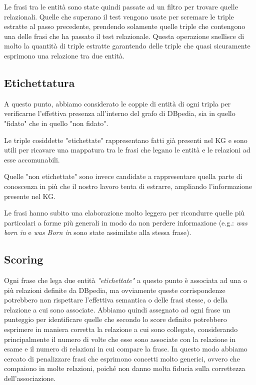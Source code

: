\documentclass[10pt,a4paper,twocolumn]{article}
\begin{document}
Le frasi tra le entità sono state quindi passate ad un filtro per trovare quelle relazionali. Quelle che superano il test vengono usate per scremare le triple estratte al passo precedente, prendendo solamente quelle triple che contengono una delle frasi che ha passato il test relazionale. Questa operazione snellisce di molto la quantità di triple estratte garantendo delle triple che quasi sicuramente esprimono una relazione tra due entità.

\subsection{Etichettatura}
A questo punto, abbiamo considerato le coppie di entità di ogni tripla per verificarne l'effettiva presenza all'interno del grafo di DBpedia, sia in quello "fidato" che in quello "non fidato".

Le triple cosiddette "etichettate" rappresentano fatti già presenti nel KG e sono utili per ricavare una mappatura tra le frasi che legano le entità e le relazioni ad esse accomunabili.

Quelle "non etichettate" sono invece candidate a rappresentare quella parte di conoscenza in più che il nostro lavoro tenta di estrarre, ampliando l'informazione presente nel KG.

Le frasi hanno subito una elaborazione molto leggera per ricondurre quelle più particolari a forme più generali in modo da non perdere informazione (e.g.: \textit{was born in} e \textit{was Born in} sono state assimilate alla stessa frase).

\subsection{Scoring}

Ogni frase che lega due entità \textit{"etichettate"} a questo punto è associata ad una o più relazioni definite da DBpedia, ma ovviamente queste corrispondenze potrebbero non rispettare l'effettiva semantica o delle frasi stesse, o della relazione a cui sono associate. Abbiamo quindi assegnato ad ogni frase un punteggio per identificare quelle che secondo lo score definito potrebbero esprimere in maniera corretta la relazione a cui sono collegate, considerando principalmente il numero di volte che esse sono associate con la relazione in esame e il numero di relazioni in cui compare la frase. In questo modo abbiamo cercato di penalizzare frasi che esprimono concetti molto generici, ovvero che compaiono in molte relazioni, poiché non danno molta fiducia sulla correttezza dell'associazione.
\end{document}

